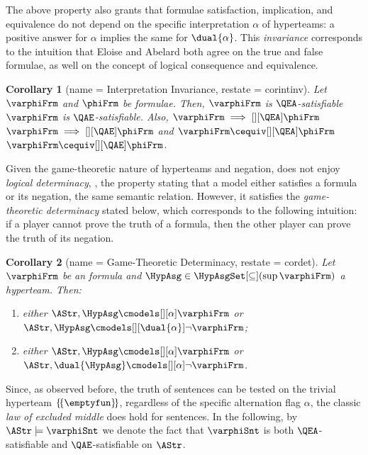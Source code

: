\documentclass[authoryear]{elsarticle}
\newtheorem{corollary}{Corollary}
\newcommand{\TrvHypAsg}{\{\!\{\emptyfun\}\!\}}
\begin{document}
The above property also grants that formulae satisfaction, implication, and
equivalence do not depend on the specific interpretation $\alpha$ of hyperteams:
a positive answer for $\alpha$ implies the same for $\dual{\alpha}$.
This \emph{invariance} corresponds to the intuition that Eloise and Abelard both
agree on the true and false formulae, as well on the concept of logical
consequence and equivalence.

\begin{corollary}[name = Interpretation Invariance, restate = corintinv]
  \label{cor:intinv}
  Let $\varphiFrm$ and $\phiFrm$ be \ADIF formulae.
  Then, $\varphiFrm$ is $\QEA$-satisfiable \iff $\varphiFrm$ is
  $\QAE$-satisfiable.
  Also, $\varphiFrm \implies[][\QEA] \phiFrm$ \iff $\varphiFrm \implies[][\QAE]
  \phiFrm$ and $\varphiFrm \cequiv[][\QEA] \phiFrm$ \iff $\varphiFrm
  \cequiv[][\QAE] \phiFrm$.
\end{corollary}

Given the game-theoretic nature of hyperteams and negation, \ADIF does not enjoy
\emph{logical determinacy}, \ie, the property stating that a model either
satisfies a formula or its negation, \wrt the same semantic relation.
However, it satisfies the \emph{game-theoretic determinacy} stated below, which
corresponds to the following intuition: if a player cannot prove the truth of a
formula, then the other player can prove the truth of its negation.

\begin{corollary}[name = Game-Theoretic Determinacy, restate = cordet]
  \label{cor:det}
  Let $\varphiFrm$ be an \ADIF formula and $\HypAsg \in
  \HypAsgSet[\subseteq](\sup{\varphiFrm})$ a hyperteam.
  Then:
  \begin{enumerate}[1)]
    \item\label{cor:det(flg)}
      either $\AStr, \HypAsg \cmodels[][\alpha] \varphiFrm$ or $\AStr, \HypAsg
      \cmodels[][\dual{\alpha}] \neg \varphiFrm$;
    \item\label{cor:det(hyp)}
      either $\AStr, \HypAsg \cmodels[][\alpha] \varphiFrm$ or $\AStr,
      \dual{\HypAsg} \cmodels[][\alpha] \neg \varphiFrm$.
  \end{enumerate}
\end{corollary}

Since, as observed before, the truth of sentences can be tested on the trivial
hyperteam $\TrvHypAsg$, regardless of the specific alternation flag $\alpha$,
the classic \emph{law of excluded middle} does hold for sentences.
In the following, by $\AStr \models \varphiSnt$ we denote the fact that
$\varphiSnt$ is both $\QEA$-satisfiable and $\QAE$-satisfiable on $\AStr$.
\end{document}
